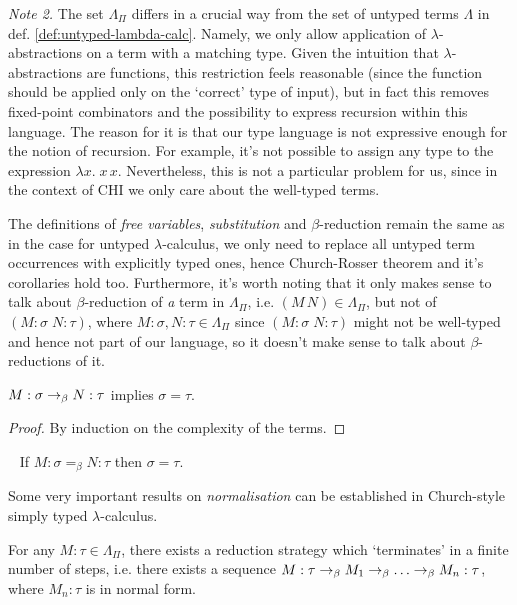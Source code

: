 \emph{Note 2.}
    The set $\Lambda_\Pi$ differs in a crucial way from the set of
    untyped terms $\Lambda$ in def.  \ref{def:untyped-lambda-calc}.
    Namely, we only allow application of $\lambda$-abstractions on a
    term with a matching type.  Given the intuition that
    $\lambda$-abstractions are functions, this restriction feels
    reasonable (since the function should be applied only on the
    `correct' type of input), but in fact this removes fixed-point
    combinators and the possibility to express recursion within this
    language. The reason for it is that our type language is not
    expressive enough for the notion of recursion. For example, it's
    not possible to assign any type to the expression $\lambda x.\; x\,
    x$. Nevertheless, this is not a particular problem for us, since in
    the context of CHI we only care about the well-typed terms.

The definitions of \emph{free variables}, \emph{substitution} and
$\beta$-reduction remain the same as in the case for untyped
$\lambda$-calculus, we only need to replace all untyped term occurrences with
explicitly typed ones, hence Church-Rosser theorem and it's corollaries hold
too. Furthermore, it's worth noting that it only makes sense to talk about
$\beta$-reduction of \emph{a} term in $\Lambda_\Pi$, i.e. $(M\, N) \in
\Lambda_\Pi$, but not of $(M\!:\!\sigma\; N\!:\!\tau)$, where $M:\sigma, N:\tau
\in \Lambda_\Pi$ since $(M\!:\!\sigma\; N\!:\!\tau)$ might not be well-typed
and hence not part of our language, so it doesn't make sense to talk about
$\beta$-reductions of it.

\begin{proposition}
    $M:\sigma \rightarrow_\beta N:\tau$ implies $\sigma = \tau$.
\end{proposition}
\begin{proof}
    By induction on the complexity of the terms.
\end{proof}

\begin{corollary} {\ }
\label{cor:uniquenessoftypes}
    If $M:\sigma =_\beta N:\tau$ then $\sigma = \tau$.
\end{corollary}

Some very important results on \emph{normalisation} can be established in
Church-style simply typed $\lambda$-calculus.
\begin{theorem}
    For any $M:\tau \in \Lambda_\Pi$, there exists a reduction strategy which
    `terminates' in a finite number of steps, i.e. there exists a sequence
    $M:\tau \rightarrow_\beta M_1 \rightarrow_\beta \ldots \rightarrow_\beta M_n:\tau$, where $M_n:\tau$
    is in normal form.
\end{theorem}

